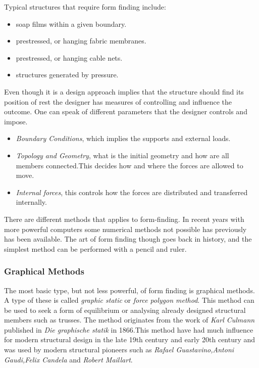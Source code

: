 Typical structures that require form finding include:

\begin{itemize}
\item soap films within a given boundary.
\item prestressed, or hanging fabric membranes.
\item prestressed, or hanging cable nets.
\item structures generated by pressure.
\end{itemize}

Even though it is a design approach implies that the structure should find its position of rest the designer has measures of controlling and influence the outcome. One can speak of different parameters that the designer controls and impose.\cite{ref:ShellOpt} 

\begin{itemize}
\item \textit{Boundary Conditions}, which implies the supports and external loads.
\item \textit{Topology and Geometry}, what is the initial geometry and how are all members connected.This decides how and where the forces are allowed to move.
\item \textit{Internal forces}, this controls how the forces are distributed and transferred internally. 
\end{itemize}

There are different methods that applies to form-finding. In recent years with more powerful computers some numerical methods not possible has previously has been available. The art of form finding though goes back in history, and the simplest method can be performed with a pencil and ruler. 

\subsubsection{Graphical Methods}

The most basic type, but not less powerful, of form finding is graphical methods. A type of these is called \textit{graphic static} or \textit{force polygon method}. This method can be used to seek a form of equilibrium or analysing already designed structural members such as trusses. The method originates from the work of \textit{Karl Culmann} published in \textit{Die graphische statik} in 1866.This method have had much influence for modern structural design in the late 19th century and early 20th century and was used by modern structural pioneers such as \textit{Rafael Guastavino,Antoni Gaudi,Felix Candela} and \textit{Robert Maillart}. 

